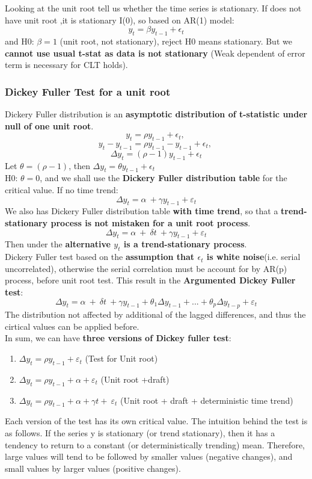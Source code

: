 \documentclass[12pt]{article}
\begin{document}
Looking at the unit root tell us whether the time series is stationary. If does not have unit root ,it is stationary I(0), so based on AR(1) model:
\begin{equation}
    y_t = \beta y_{t-1} +\epsilon_t
\end{equation}
and H0: $\beta = 1$ (unit root, not stationary), reject H0 means stationary. But we \textbf{cannot use usual t-stat as data is not stationary} (Weak dependent of error term is necessary for CLT holds).
\\

{\color{RoyalBlue}
\subsubsection{Dickey Fuller Test for a unit root}}
Dickery Fuller distribution is an \textbf{asymptotic distribution of t-statistic under null of one unit root}.
$$ y_t = \rho y_{t-1} +\epsilon_t, \  $$
$$ y_t - y_{t-1}= \rho y_{t-1} - y_{t-1} +\epsilon_t, \  $$
$$\Delta{y_t} = (\rho -1) y_{t-1} + \epsilon_t $$
Let $\theta = (\rho -1)$, then $\Delta{y_t} =\theta y_{t-1} + \epsilon_t $
\\

H0: $\theta = 0 $, and we shall use the \textbf{Dickery Fuller distribution table} for the critical value. If no time trend:
$$\Delta y_t=\alpha\ +\gamma y_{t-1}+\varepsilon_t$$
We also has Dickery Fuller distribution table \textbf{with time trend}, so that a \textbf{trend-stationary process is not mistaken for a unit root process}. $$\Delta y_t=\alpha\ +\ \delta t\ +\gamma y_{t-1}+\varepsilon_t$$
Then under the \textbf{alternative $y_t$ is a trend-stationary process}. 
\\

Dickery Fuller test based on the \textbf{assumption that $\epsilon_t$ is white noise}(i.e. serial uncorrelated), otherwise the serial correlation must be account for by AR(p) process, before unit root test. This result in the \textbf{Argumented Dickey Fuller test}:
$$\Delta y_t=\alpha\ +\ \delta t\ +\gamma y_{t-1}+\theta_1\Delta y_{t-1}+...+\theta_p\Delta y_{t-p}+\varepsilon_t$$
The distribution not affected by additional of the lagged differences, and thus the cirtical values can be applied before.
\\

In sum, we can have \textbf{three versions of Dickey fuller test}:
\begin{enumerate}
\item $\Delta y_t=\rho y_{t-1}+\varepsilon_t$ (Test for Unit root)
\item $\Delta y_t=\rho y_{t-1}+\alpha+\varepsilon_t$ (Unit root +draft)
\item $\Delta y_t=\rho y_{t-1}+\alpha+\gamma t+\ \varepsilon_t$ (Unit root + draft + deterministic time trend)
\end{enumerate}
Each version of the test has its own critical value. The intuition behind the test is as follows. If the series y is stationary (or trend stationary), then it has a tendency to return to a constant (or deterministically trending) mean. Therefore, large values will tend to be followed by smaller values (negative changes), and small values by larger values (positive changes). 
\\
\end{document}
